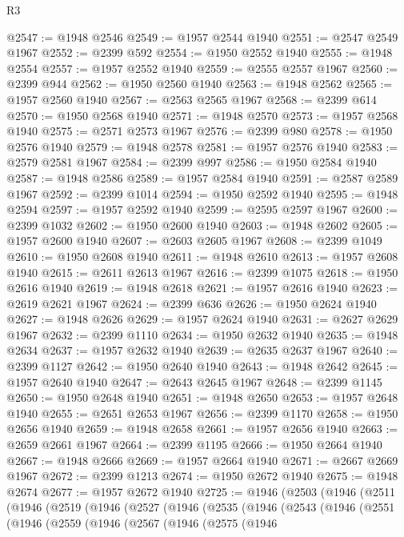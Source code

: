 \begin{lexlean}{R3}
\begin{coremodule}
@2547 := @1948 @2546
@2549 := @1957 @2544 @1940
@2551 := @2547 @2549 @1967
@2552 := @2399 @592
@2554 := @1950 @2552 @1940
@2555 := @1948 @2554
@2557 := @1957 @2552 @1940
@2559 := @2555 @2557 @1967
@2560 := @2399 @944
@2562 := @1950 @2560 @1940
@2563 := @1948 @2562
@2565 := @1957 @2560 @1940
@2567 := @2563 @2565 @1967
@2568 := @2399 @614
@2570 := @1950 @2568 @1940
@2571 := @1948 @2570
@2573 := @1957 @2568 @1940
@2575 := @2571 @2573 @1967
@2576 := @2399 @980
@2578 := @1950 @2576 @1940
@2579 := @1948 @2578
@2581 := @1957 @2576 @1940
@2583 := @2579 @2581 @1967
@2584 := @2399 @997
@2586 := @1950 @2584 @1940
@2587 := @1948 @2586
@2589 := @1957 @2584 @1940
@2591 := @2587 @2589 @1967
@2592 := @2399 @1014
@2594 := @1950 @2592 @1940
@2595 := @1948 @2594
@2597 := @1957 @2592 @1940
@2599 := @2595 @2597 @1967
@2600 := @2399 @1032
@2602 := @1950 @2600 @1940
@2603 := @1948 @2602
@2605 := @1957 @2600 @1940
@2607 := @2603 @2605 @1967
@2608 := @2399 @1049
@2610 := @1950 @2608 @1940
@2611 := @1948 @2610
@2613 := @1957 @2608 @1940
@2615 := @2611 @2613 @1967
@2616 := @2399 @1075
@2618 := @1950 @2616 @1940
@2619 := @1948 @2618
@2621 := @1957 @2616 @1940
@2623 := @2619 @2621 @1967
@2624 := @2399 @636
@2626 := @1950 @2624 @1940
@2627 := @1948 @2626
@2629 := @1957 @2624 @1940
@2631 := @2627 @2629 @1967
@2632 := @2399 @1110
@2634 := @1950 @2632 @1940
@2635 := @1948 @2634
@2637 := @1957 @2632 @1940
@2639 := @2635 @2637 @1967
@2640 := @2399 @1127
@2642 := @1950 @2640 @1940
@2643 := @1948 @2642
@2645 := @1957 @2640 @1940
@2647 := @2643 @2645 @1967
@2648 := @2399 @1145
@2650 := @1950 @2648 @1940
@2651 := @1948 @2650
@2653 := @1957 @2648 @1940
@2655 := @2651 @2653 @1967
@2656 := @2399 @1170
@2658 := @1950 @2656 @1940
@2659 := @1948 @2658
@2661 := @1957 @2656 @1940
@2663 := @2659 @2661 @1967
@2664 := @2399 @1195
@2666 := @1950 @2664 @1940
@2667 := @1948 @2666
@2669 := @1957 @2664 @1940
@2671 := @2667 @2669 @1967
@2672 := @2399 @1213
@2674 := @1950 @2672 @1940
@2675 := @1948 @2674
@2677 := @1957 @2672 @1940
@2725 := @1946
    (@2503
      (@1946
        (@2511
          (@1946
            (@2519
              (@1946
                (@2527
                  (@1946
                    (@2535
                      (@1946
                        (@2543
                          (@1946
                            (@2551
                              (@1946
                                (@2559
                                  (@1946
                                    (@2567
                                      (@1946
                                        (@2575
                                          (@1946

\end{coremodule}
\end{lexlean}
